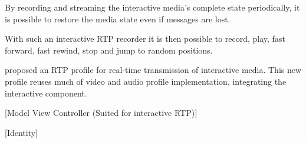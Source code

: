 	By recording and streaming the interactive media's complete state periodically, it is possible to restore the media state even if messages are lost.

	With such an interactive \ac{RTP} recorder it is then possible to record, play, fast forward, fast rewind, stop and jump to random positions.

  \cite{interactive_stream} proposed an \ac{RTP} profile for real-time transmission of interactive media. This new profile reuses much of video and audio profile implementation, integrating the interactive component.
	
  {\color{red}[Model View Controller (Suited for interactive RTP)]}


  {\color{red}[Identity]}



